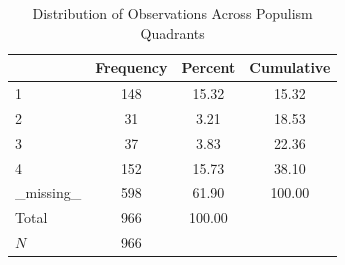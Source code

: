 \begin{table}[htbp]\centering
\def\sym#1{\ifmmode^{#1}\else\(^{#1}\)\fi}
\caption{Distribution of Observations Across Populism Quadrants}
\begin{tabular}{l*{1}{ccc}}
\hline\hline
            &   Frequency&     Percent&  Cumulative\\
\hline
1           &         148&       15.32&       15.32\\
2           &          31&        3.21&       18.53\\
3           &          37&        3.83&       22.36\\
4           &         152&       15.73&       38.10\\
\_missing\_   &         598&       61.90&      100.00\\
Total       &         966&      100.00&            \\
\hline
\(N\)       &         966&            &            \\
\hline\hline
\end{tabular}
\end{table}
